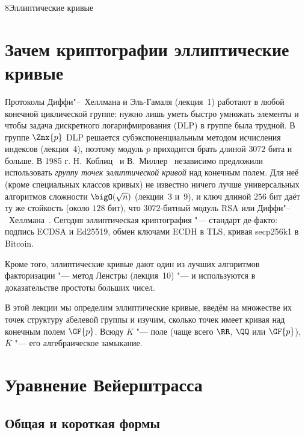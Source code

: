 \begin{lecture}{8}{Эллиптические кривые}

\section{Зачем криптографии эллиптические кривые}

Протоколы Диффи"--~Хеллмана и Эль-Гамаля (лекция~1) работают в любой конечной циклической
группе: нужно лишь уметь быстро умножать элементы и чтобы задача дискретного логарифмирования
(DLP) в группе была трудной. В группе $\Znx{p}$ DLP решается субэкспоненциальным методом
исчисления индексов (лекция~4), поэтому модуль $p$ приходится брать длиной $3072$ бита и больше.
В 1985 г. Н.~Коблиц~\cite{koblitz-ecc} и В.~Миллер~\cite{miller-ecc} независимо предложили
использовать \emph{группу точек эллиптической кривой} над конечным полем. Для неё (кроме
специальных классов кривых) не известно ничего лучше универсальных алгоритмов сложности
$\bigO(\sqrt n)$ (лекции~3 и~9), и ключ длиной $256$ бит даёт ту же стойкость (около $128$ бит),
что $3072$-битный модуль RSA или Диффи"--~Хеллмана~\cite{nist-sp800-57}. Сегодня
эллиптическая криптография "--- стандарт де-факто: подпись ECDSA и Ed25519, обмен ключами ECDH
в TLS, кривая secp256k1 в Bitcoin.

Кроме того, эллиптические кривые дают один из лучших алгоритмов факторизации "--- метод Ленстры
(лекция~10) "--- и используются в доказательстве простоты больших чисел.

В этой лекции мы определим эллиптические кривые, введём на множестве их точек структуру
абелевой группы и изучим, сколько точек имеет кривая над конечным полем $\GF{p}$.
Всюду $K$ "--- поле (чаще всего $\RR$, $\QQ$ или $\GF{p}$), $\overline K$ "--- его алгебраическое
замыкание.

\section{Уравнение Вейерштрасса}

\subsection{Общая и короткая формы}


\end{lecture}
